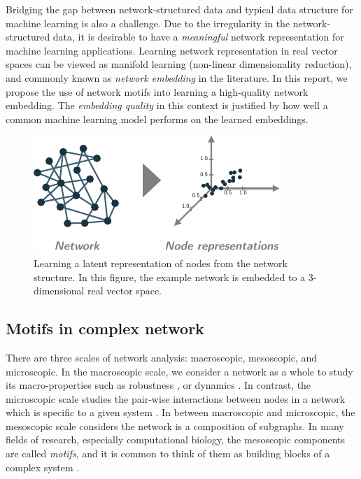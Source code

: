 \documentclass{article}
\theoremstyle{definition}
\begin{document}
Bridging the gap between network-structured data and typical
data structure for machine learning is also a challenge. 
Due to the irregularity in the network-structured data, 
it is desirable to have a \emph{meaningful}
network representation for machine learning applications. 
Learning network representation in real vector spaces can be
viewed as manifold learning (non-linear dimensionality reduction),
and commonly known as \emph{network embedding} in the literature.
In this report, we propose the use of network motifs into learning
a high-quality network embedding. The \emph{embedding quality} in this
context is justified by how well a common machine learning model performs 
on the learned embeddings.

\begin{figure} \label{fig:cartoon}
    \centering
    \includegraphics[width=0.8\linewidth]{cartoon_emb}
    \caption{Learning a latent representation of nodes from the network structure. In this figure, the example network is embedded to a 3-dimensional real vector space.}
\end{figure}

\subsection{Motifs in complex network}

There are three scales of network analysis: macroscopic, mesoscopic, 
and microscopic. In the macroscopic scale, we consider a network as a 
whole to study its macro-properties such as robustness 
\cite{callaway2000network}, or dynamics \cite{barabasi2014network}.
In contrast, the microscopic scale studies the pair-wise interactions
between nodes in a network which is specific to a given system 
\cite{physicnet}. In between macroscopic and microscopic, the mesoscopic 
scale considers the network is a composition of subgraphs. 
In many fields of research, especially computational biology, the
mesoscopic components are called \emph{motifs}, and it is common
to think of them as building blocks of a complex system 
\cite{motifblockmilo}.
\end{document}
